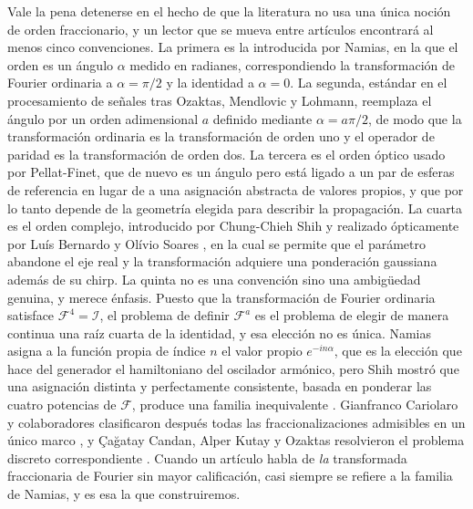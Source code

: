 		Vale la pena detenerse en el hecho de que la literatura no usa una única noción de orden fraccionario, y un lector que se mueva entre artículos encontrará al menos cinco convenciones. La primera es la introducida por Namias, en la que el orden es un ángulo $\alpha$ medido en radianes, correspondiendo la transformación de Fourier ordinaria a $\alpha = \pi/2$ y la identidad a $\alpha = 0$. La segunda, estándar en el procesamiento de señales tras Ozaktas, Mendlovic y Lohmann, reemplaza el ángulo por un orden adimensional $a$ definido mediante $\alpha = a\pi/2$, de modo que la transformación ordinaria es la transformación de orden uno y el operador de paridad es la transformación de orden dos. La tercera es el orden óptico usado por Pellat-Finet, que de nuevo es un ángulo pero está ligado a un par de esferas de referencia en lugar de a una asignación abstracta de valores propios, y que por lo tanto depende de la geometría elegida para describir la propagación. La cuarta es el orden complejo, introducido por Chung-Chieh Shih \citeyearpar{shih1995optical} y realizado ópticamente por Luís Bernardo y Olívio Soares \citeyearpar{bernardo1996optical}, en la cual se permite que el parámetro abandone el eje real y la transformación adquiere una ponderación gaussiana además de su chirp. La quinta no es una convención sino una ambigüedad genuina, y merece énfasis. Puesto que la transformación de Fourier ordinaria satisface $\mathcal{F}^{4} = \mathcal{I}$, el problema de definir $\mathcal{F}^{a}$ es el problema de elegir de manera continua una raíz cuarta de la identidad, y esa elección no es única. Namias asigna a la función propia de índice $n$ el valor propio $e^{-in\alpha}$, que es la elección que hace del generador el hamiltoniano del oscilador armónico, pero Shih mostró que una asignación distinta y perfectamente consistente, basada en ponderar las cuatro potencias de $\mathcal{F}$, produce una familia inequivalente \citep{shih1995fractionalization}. Gianfranco Cariolaro y colaboradores clasificaron después todas las fraccionalizaciones admisibles en un único marco \citep{cariolaro1998unified}, y Çağatay Candan, Alper Kutay y Ozaktas resolvieron el problema discreto correspondiente \citep{candan2000discrete}. Cuando un artículo habla de \textit{la} transformada fraccionaria de Fourier sin mayor calificación, casi siempre se refiere a la familia de Namias, y es esa la que construiremos.

